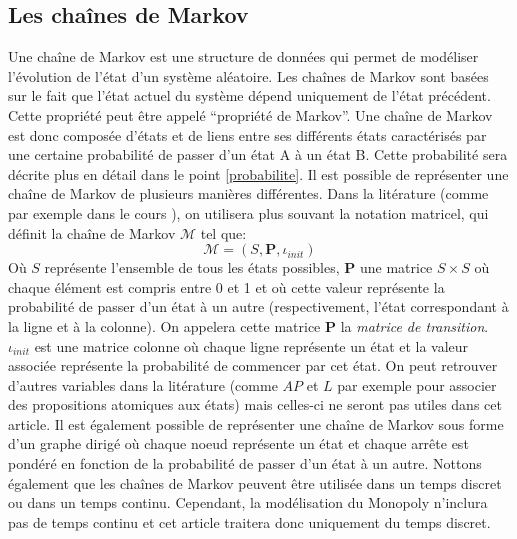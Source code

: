 \documentclass[letterpaper]{article}
\begin{document}
  \subsection{Les chaînes de Markov}
    \label{def_chaine_markov}
    Une chaîne de Markov est une structure de données qui permet de modéliser l'évolution
    de l'état d'un système aléatoire.  Les chaînes de Markov sont basées sur le 
    fait que l'état actuel du système dépend uniquement de l'état précédent.
    Cette propriété peut être appelé ``propriété de Markov''.  Une chaîne de
    Markov est donc composée d'états et de liens entre ses différents états caractérisés
    par une certaine probabilité de passer d'un état A à un état B.
    Cette probabilité sera décrite plus en détail dans le point \ref{probabilite}.
    Il est possible de représenter une chaîne de Markov de plusieurs manières différentes.
    Dans la litérature (comme par exemple dans le cours \citet{COURS}), on utilisera 
    plus souvant la notation matricel, qui définit la chaîne de Markov $\mathcal{M}$ 
    tel que:
    $$\mathcal{M} = (S, \mathbf{P}, \iota_{init})$$
    Où $S$ représente l'ensemble de tous les états possibles, $\mathbf{P}$ une matrice $S \times S$
    où chaque élément est compris entre 0 et 1 et où cette valeur représente la probabilité 
    de passer d'un état à un autre (respectivement, l'état correspondant à la ligne et à la colonne).
    On appelera cette matrice $\mathbf{P}$ la \textit{matrice de transition}.
    $\iota_{init}$ est une matrice colonne où chaque ligne représente un état et la valeur
    associée représente la probabilité de commencer par cet état.  On peut retrouver d'autres
    variables dans la litérature (comme $AP$ et $L$ par exemple pour associer des propositions 
    atomiques aux états) mais celles-ci ne seront pas utiles dans cet article.
    Il est également possible de représenter une chaîne de Markov sous forme
    d'un graphe dirigé où chaque noeud représente un état et chaque arrête est pondéré
    en fonction de la probabilité de passer d'un état à un autre.
    Nottons également que les chaînes de Markov peuvent être utilisée
    dans un temps discret ou dans un temps continu.  Cependant, la modélisation
    du Monopoly n'inclura pas de temps continu et cet article traitera donc uniquement
    du temps discret.
    
\end{document}
